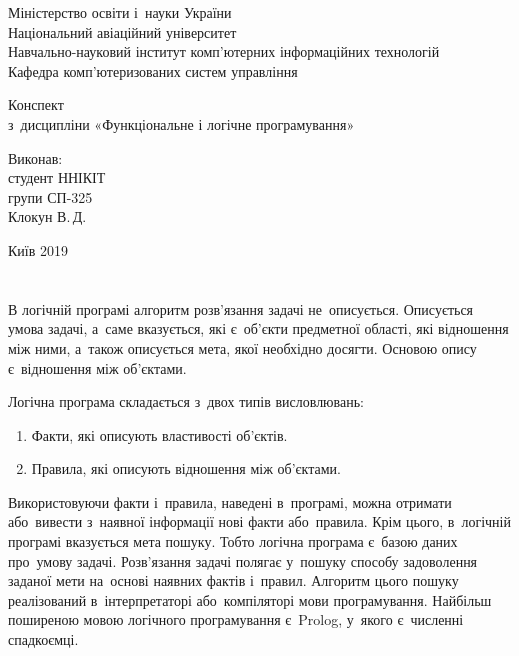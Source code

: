 \documentclass[
	a4paper,
	oneside,
	BCOR = 10mm,
	DIV = 12,
	12pt,
	headings = normal,
]{scrartcl}
\newcommand{\allcaps}[1]{{\addfontfeatures{LetterSpace = 8, Kerning = Off}#1}}
\begin{document}

\begin{titlepage}
		\begin{center}
			Міністерство освіти і~науки України\\
			Національний авіаційний університет\\
			Навчально-науковий інститут комп'ютерних інформаційних технологій\\
			Кафедра комп'ютеризованих систем управління

			\vspace{\fill}
				Конспект\\
				з~дисципліни «Функціональне і логічне програмування»\\

			\vspace{\fill}

			\begin{flushright}
				Виконав:\\
				студент \allcaps{ННІКІТ}\\
				групи СП-325\\
				Клокун В.\,Д.\\
			\end{flushright}

			Київ 2019
		\end{center}
	\end{titlepage}

	\section{}
		В логічній програмі алгоритм розв'язання задачі не~описується. Описується умова задачі, а~саме вказується, які є~об'єкти предметної області, які відношення між ними, а~також описується мета, якої необхідно досягти. Основою опису є~відношення між об'єктами. 

		Логічна програма складається з~двох типів висловлювань:
		\begin{enumerate}
			\item Факти, які описують властивості об'єктів. 
			\item Правила, які описують відношення між об'єктами. 
		\end{enumerate}

		Використовуючи факти і~правила, наведені в~програмі, можна отримати або~вивести з~наявної інформації нові факти або~правила. Крім цього, в~логічній програмі вказується мета пошуку. Тобто логічна програма є~базою даних про~умову задачі. Розв'язання задачі полягає у~пошуку способу задоволення заданої мети на~основі наявних фактів і~правил. Алгоритм цього пошуку реалізований в~інтерпретаторі або~компіляторі мови програмування. Найбільш поширеною мовою логічного програмування є~Prolog, у~якого є~численні спадкоємці. 
\end{document}
